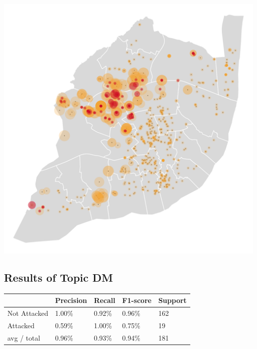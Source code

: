 \documentclass[conference]{IEEEtran}
\begin{document}
{
\centering
\includegraphics[width=0.95\linewidth]{visualisation.png}\\
\label{fig:visualisation}
}

\break


\subsection{Results of Topic DM} \label{dmres}
{
\begin{center}
\centering
{}\label{fig:results}
\begin{tabular}{@{}lllll@{}}
\toprule
& Precision & Recall & F1-score & Support                  
\\ \midrule
\multicolumn{1}{|l|}{Not Attacked}  & 
\multicolumn{1}{l|}{1.00\%} & 
\multicolumn{1}{l|}{0.92\%} & 
\multicolumn{1}{l|}{0.96\%} & 
\multicolumn{1}{l|}{162} 
\\ \midrule

\multicolumn{1}{|l|}{Attacked} & 
\multicolumn{1}{l|}{0.59\%} & 
\multicolumn{1}{l|}{1.00\%} & 
\multicolumn{1}{l|}{0.75\%} & 
\multicolumn{1}{l|}{19} 

\\ \midrule
avg / total & 0.96\% & 0.93\% & 0.94\% & 181                      

\\ \bottomrule
\end{tabular}
\end{center}
}
\end{document}
